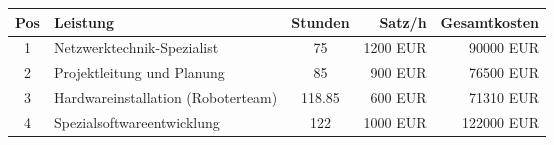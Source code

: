 
                \begin{longtable}{|c|p{6cm}|c|r|r|}
                \hline
                \rowcolor{gray!30}
                \textbf{Pos} & \textbf{Leistung} & \textbf{Stunden} & \textbf{Satz/h} & \textbf{Gesamtkosten} \\
                \hline
                \endfirsthead
                \hline 
            

                    1 & Netzwerktechnik-Spezialist & 75 & 1200 EUR & 90000 EUR \\
                    \hline 
                    
                    2 & Projektleitung und Planung & 85 & 900 EUR & 76500 EUR \\
                    \hline 
                    
                    3 & Hardwareinstallation (Roboterteam) & 118.85 & 600 EUR & 71310 EUR \\
                    \hline 
                    
                    4 & Spezialsoftwareentwicklung & 122 & 1000 EUR & 122000 EUR \\
                    \hline 
                    

                \end{longtable} 
            